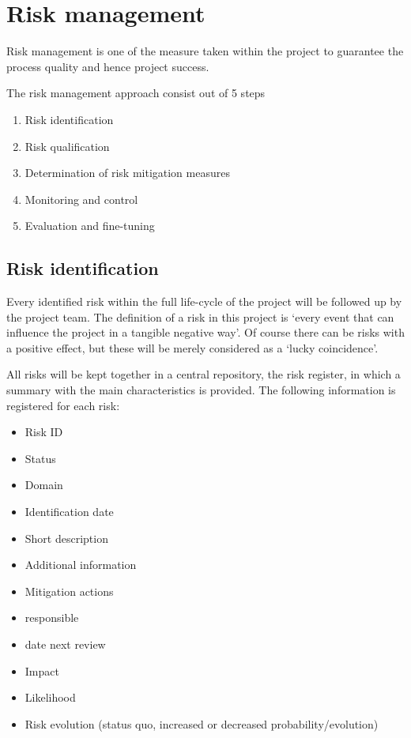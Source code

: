 \section{Risk management}
\label{sec:risk-management}
Risk management is one of the measure taken within the project to guarantee the process quality and hence project success.

The risk management approach consist out of 5 steps

\begin{enumerate}
	\item Risk identification 
	\item Risk qualification
	\item Determination of risk mitigation measures
	\item Monitoring and control
	\item Evaluation and fine-tuning
\end {enumerate}
\subsection{Risk identification}
Every identified risk within the full life-cycle of the project will be followed up by the project team.
The definition of a risk in this project is  `every event that can influence the project in a tangible negative way'.
Of course there can be risks with a positive effect, but these will be merely considered as a `lucky coincidence'.

All risks will be kept together in a central repository, the risk register, in which a summary with the main characteristics is provided.
The following information is registered for each risk:

\begin{itemize}
	\item Risk ID
	\item Status
	\item Domain
	\item Identification date
	\item Short description
	\item Additional information
	\item Mitigation actions
	\item responsible
	\item date next review
	\item Impact
	\item Likelihood
	\item Risk evolution (status quo, increased or decreased probability/evolution)
\end{itemize}

